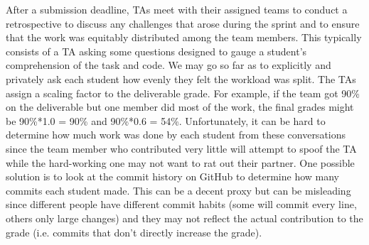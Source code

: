 \documentclass[preprint,journal]{vgtc}       %
\begin{document}
After a submission deadline, TAs meet with their assigned
teams to conduct a retrospective to discuss any challenges that arose
during the sprint and to ensure that the work was equitably distributed among the
team members. This typically consists of a TA asking some questions designed to
gauge a student's comprehension of the task and code. We may go so far as to
explicitly and privately ask each student how evenly they felt the workload was
split. The TAs assign a scaling factor to the deliverable grade. For example, if
the team got 90\% on the deliverable but one member did most of the work, the final
grades might be 90\%*1.0 = 90\% and 90\%*0.6 = 54\%. Unfortunately, it can be hard
to determine how much work was done by each student from these conversations since
the team member who contributed very little will attempt to spoof the TA while the
hard-working one may not want to rat out their partner. One possible solution is
to look at the commit history on GitHub to determine how many commits each student
made. This can be a decent proxy but can be misleading since different people have
different commit habits (some will commit every line, others only large changes)
and they may not reflect the actual contribution to the grade (i.e. commits that
don't directly increase the grade).

\end{document}
